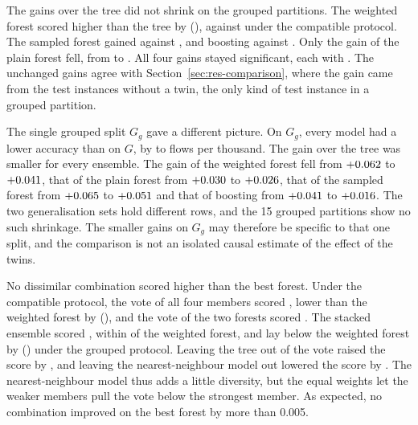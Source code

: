 \documentclass[10pt,conference]{IEEEtran}
\begin{document}
The gains over the tree did not shrink on the grouped partitions. The weighted forest scored higher than the tree by \OSGrpRfWVsTreeMacroFAbsDiff{} (\OSGrpRfWVsTreeMacroFCor{}), against \OSCompRfWVsTreeMacroFAbsDiff{} under the compatible protocol. The sampled forest gained \OSGrpRfSVsTreeMacroFAbsDiff{} against \OSCompRfSVsTreeMacroFAbsDiff{}, and boosting \OSGrpBoostVsTreeMacroFAbsDiff{} against \OSCompBoostVsTreeMacroFAbsDiff{}. Only the gain of the plain forest fell, from \OSCompRfVsTreeMacroFAbsDiff{} to \OSGrpRfVsTreeMacroFAbsDiff{}. All four gains stayed significant, each with \OSGrpRfVsTreeMacroFCor{}. The unchanged gains agree with Section~\ref{sec:res-comparison}, where the gain came from the test instances without a twin, the only kind of test instance in a grouped partition.

The single grouped split $G_{g}$ gave a different picture. On $G_{g}$, every model had a lower accuracy than on $G$, by \OGAccDropMinPerK{} to \OGAccDropMaxPerK{} flows per thousand. The gain over the tree was smaller for every ensemble. The gain of the weighted forest fell from $+0.062$ to $+0.041$, that of the plain forest from $+0.030$ to $+0.026$, that of the sampled forest from $+0.065$ to $+0.051$ and that of boosting from $+0.041$ to $+0.016$. The two generalisation sets hold different rows, and the 15 grouped partitions show no such shrinkage. The smaller gains on $G_{g}$ may therefore be specific to that one split, and the comparison is not an isolated causal estimate of the effect of the twins.

No dissimilar combination scored higher than the best forest. Under the compatible protocol, the vote of all four members scored \OPCompVoteAllMacroF{}, lower than the weighted forest by \OSCompVoteAllVsRfWMacroFAbsDiff{} (\OSCompVoteAllVsRfWMacroFCor{}), and the vote of the two forests scored \OPCompVoteForestsMacroF{}. The stacked ensemble scored \OPCompStackMacroF{}, within \OSCompStackVsRfWMacroFAbsDiff{} of the weighted forest, and lay below the weighted forest by \OSGrpStackVsRfWMacroFAbsDiff{} (\OSGrpStackVsRfWMacroFCor{}) under the grouped protocol. Leaving the tree out of the vote raised the score by \OSCompVoteNoTreeVsVoteAllMacroFAbsDiff{}, and leaving the nearest-neighbour model out lowered the score by \OSCompVoteNoKnnVsVoteAllMacroFAbsDiff{}. The nearest-neighbour model thus adds a little diversity, but the equal weights let the weaker members pull the vote below the strongest member. As expected, no combination improved on the best forest by more than 0.005.
\end{document}

